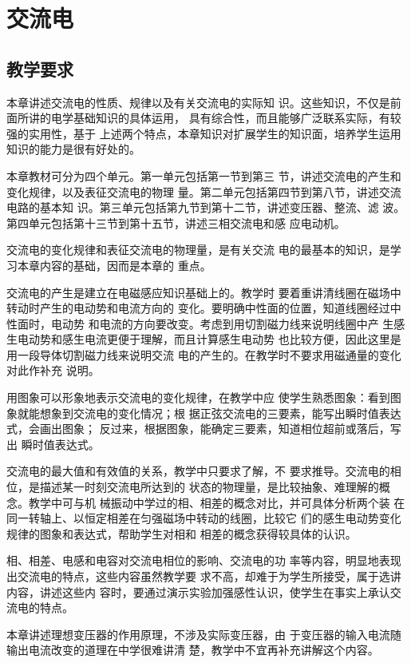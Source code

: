 \chapter{交流电}\minitoc[n]
\section{教学要求}
本章讲述交流电的性质、规律以及有关交流电的实际知
识。这些知识，不仅是前面所讲的电学基础知识的具体运用，
具有综合性，而且能够广泛联系实际，有较强的实用性，基于
上述两个特点，本章知识对扩展学生的知识面，培养学生运用
知识的能力是很有好处的。

本章教材可分为四个单元。第一单元包括第一节到第三
节，讲述交流电的产生和变化规律，以及表征交流电的物理
量。第二单元包括第四节到第八节，讲述交流电路的基本知
识。第三单元包括第九节到第十二节，讲述变压器、整流、滤
波。第四单元包括第十三节到第十五节，讲述三相交流电和感
应电动机。

交流电的变化规律和表征交流电的物理量，是有关交流
电的最基本的知识，是学习本章内容的基础，因而是本章的
重点。

交流电的产生是建立在电磁感应知识基础上的。教学时
要着重讲清线圈在磁场中转动时产生的电动势和电流方向的
变化。要明确中性面的位置，知道线圈经过中性面时，电动势
和电流的方向要改变。考虑到用切割磁力线来说明线圈中产
生感生电动势和感生电流更便于理解，而且计算感生电动势
也比较方便，因此这里是用一段导体切割磁力线来说明交流
电的产生的。在教学时不要求用磁通量的变化对此作补充
说明。

用图象可以形象地表示交流电的变化规律，在教学中应
使学生熟悉图象：看到图象就能想象到交流电的变化情况；根
据正弦交流电的三要素，能写出瞬时值表达式，会画出图象；
反过来，根据图象，能确定三要素，知道相位超前或落后，写出
瞬时值表达式。

交流电的最大值和有效值的关系，教学中只要求了解，不
要求推导。交流电的相位，是描述某一时刻交流电所达到的
状态的物理量，是比较抽象、难理解的概念。教学中可与机
械振动中学过的相、相差的概念对比，并可具体分析两个装
在同一转轴上、以恒定相差在匀强磁场中转动的线圈，比较它
们的感生电动势变化规律的图象和表达式，帮助学生对相和
相差的概念获得较具体的认识。

相、相差、电感和电容对交流电相位的影响、交流电的功
率等内容，明显地表现出交流电的特点，这些内容虽然教学要
求不高，却难于为学生所接受，属于选讲内容，讲述这些内
容时，要通过演示实验加强感性认识，使学生在事实上承认交
流电的特点。

本章讲述理想变压器的作用原理，不涉及实际变压器，由
于变压器的输入电流随输出电流改变的道理在中学很难讲清
楚，教学中不宜再补充讲解这个内容。


